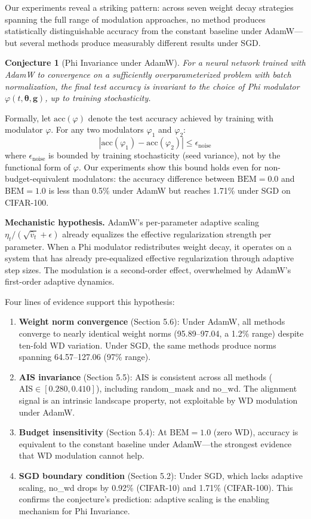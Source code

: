 \documentclass[
]{article}
\begin{document}
Our experiments reveal a striking pattern: across seven weight decay
strategies spanning the full range of modulation approaches, no method
produces statistically distinguishable accuracy from the constant
baseline under AdamW---but several methods produce measurably different
results under SGD.

\textbf{Conjecture 1} (Phi Invariance under AdamW). \emph{For a neural
network trained with AdamW to convergence on a sufficiently
overparameterized problem with batch normalization, the final test
accuracy is invariant to the choice of Phi modulator
\(\varphi(t, \boldsymbol{\theta}, \mathbf{g})\), up to training
stochasticity.}

Formally, let \(\mathrm{acc}(\varphi)\) denote the test accuracy
achieved by training with modulator \(\varphi\). For any two modulators
\(\varphi_1\) and \(\varphi_2\): \[
|\mathrm{acc}(\varphi_1) - \mathrm{acc}(\varphi_2)| \leq \epsilon_{\mathrm{noise}}
\] where \(\epsilon_{\mathrm{noise}}\) is bounded by training
stochasticity (seed variance), not by the functional form of
\(\varphi\). Our experiments show this bound holds even for
non-budget-equivalent modulators: the accuracy difference between
\(\mathrm{BEM} = 0.0\) and \(\mathrm{BEM} = 1.0\) is less than 0.5\%
under AdamW but reaches 1.71\% under SGD on CIFAR-100.

\textbf{Mechanistic hypothesis.} AdamW's per-parameter adaptive scaling
\(\eta_t / (\sqrt{\hat{v}_t} + \epsilon)\) already equalizes the
effective regularization strength per parameter. When a Phi modulator
redistributes weight decay, it operates on a system that has already
pre-equalized effective regularization through adaptive step sizes. The
modulation is a second-order effect, overwhelmed by AdamW's first-order
adaptive dynamics.

Four lines of evidence support this hypothesis:

\begin{enumerate}
\def\labelenumi{\arabic{enumi}.}
\item
  \textbf{Weight norm convergence} (Section 5.6): Under AdamW, all
  methods converge to nearly identical weight norms (95.89--97.04, a
  1.2\% range) despite ten-fold WD variation. Under SGD, the same
  methods produce norms spanning 64.57--127.06 (97\% range).
\item
  \textbf{AIS invariance} (Section 5.5): AIS is consistent across all
  methods (\(\mathrm{AIS} \in [0.280, 0.410]\)), including random\_mask
  and no\_wd. The alignment signal is an intrinsic landscape property,
  not exploitable by WD modulation under AdamW.
\item
  \textbf{Budget insensitivity} (Section 5.4): At \(\mathrm{BEM} = 1.0\)
  (zero WD), accuracy is equivalent to the constant baseline under
  AdamW---the strongest evidence that WD modulation cannot help.
\item
  \textbf{SGD boundary condition} (Section 5.2): Under SGD, which lacks
  adaptive scaling, no\_wd drops by 0.92\% (CIFAR-10) and 1.71\%
  (CIFAR-100). This confirms the conjecture's prediction: adaptive
  scaling is the enabling mechanism for Phi Invariance.
\end{enumerate}
\end{document}
